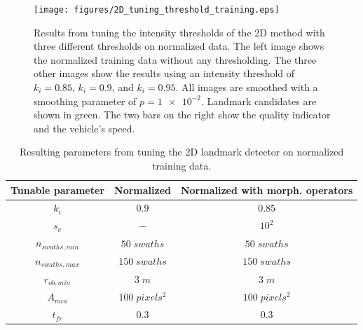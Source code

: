 \begin{figure}  %
  \centering
  \texttt{[image: figures/2D\_tuning\_threshold\_training.eps]}
  \caption[Results of tuning intensity threshold the 2D method]{Results from tuning the intensity thresholds of the 2D method with three different thresholds on normalized data. The left image shows the normalized training data without any thresholding. The three other images show the results using an intensity threshold of $k_i = 0.85$, $k_i = 0.9$, and $k_i = 0.95$. All images are smoothed with a smoothing parameter of $p = \num{1e-2}$. Landmark candidates are shown in green. The two bars on the right show the quality indicator and the vehicle's speed.}
  \label{fig:2D_tuning_intensity_thres}
\end{figure}

\begin{table} 
    \caption{Resulting parameters from tuning the 2D landmark detector on normalized training data.}
    \centering
    \begin{tabular}{ccc}
        \hline
        \textbf{Tunable parameter} & \textbf{Normalized} & \textbf{Normalized with morph. operators} \\ \hline
        $k_i$                      & $0.9$               & $0.85$                                    \\
        $s_c$                      & $-$                 & $10^2$                                    \\
        $n_{swaths, min}$          & $50 \; swaths$      & $50 \; swaths$                            \\
        $n_{swaths, max}$          & $150\; swaths$      & $150 \; swaths$                           \\
        $r_{ob, min}$              & $3 \; m$            & $3 \; m$                                  \\ 
        $A_{min}$                  & $100 \; pixels^2$   & $100 \; pixels^2$                         \\
        $t_{fr}$                   & $0.3$               & $0.3$                                     \\ \hline
        
    \end{tabular}
    \label{tab:2D_parameters}
\end{table}


